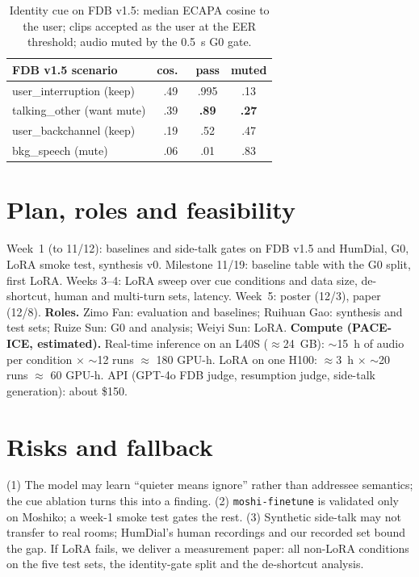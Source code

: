 \documentclass[11pt]{article}
\begin{document}
\begin{table}[t]
\centering\small
\begin{tabular}{lccc}
\toprule
FDB v1.5 scenario & cos.\ & pass & muted \\
\midrule
user\_interruption (keep) & .49 & .995 & .13 \\
talking\_other (want mute) & .39 & \textbf{.89} & \textbf{.27} \\
user\_backchannel (keep) & .19 & .52 & .47 \\
bkg\_speech (mute) & .06 & .01 & .83 \\
\bottomrule
\end{tabular}
\caption{Identity cue on FDB v1.5: median ECAPA cosine to the user; clips accepted as the user at the EER threshold; audio muted by the 0.5~s G0 gate.}
\label{tab:pilot}
\end{table}

\section{Plan, roles and feasibility}
Week~1 (to 11/12): baselines and side-talk gates on FDB v1.5 and HumDial, G0, LoRA smoke test, synthesis v0. Milestone 11/19: baseline table with the G0 split, first LoRA. Weeks 3--4: LoRA sweep over cue conditions and data size, de-shortcut, human and multi-turn sets, latency. Week~5: poster (12/3), paper (12/8).
\textbf{Roles.} Zimo Fan: evaluation and baselines; Ruihuan Gao: synthesis and test sets; Ruize Sun: G0 and analysis; Weiyi Sun: LoRA.
\textbf{Compute (PACE-ICE, estimated).} Real-time inference on an L40S ($\approx$24~GB): $\sim$15~h of audio per condition $\times$ $\sim$12 runs $\approx$ 180 GPU-h. LoRA on one H100: $\approx$3~h $\times$ $\sim$20 runs $\approx$ 60 GPU-h. API (GPT-4o FDB judge, resumption judge, side-talk generation): about \$150.

\section{Risks and fallback}
(1) The model may learn ``quieter means ignore'' rather than addressee semantics; the cue ablation turns this into a finding. (2) \texttt{moshi-finetune} is validated only on Moshiko; a week-1 smoke test gates the rest. (3) Synthetic side-talk may not transfer to real rooms; HumDial's human recordings and our recorded set bound the gap. If LoRA fails, we deliver a measurement paper: all non-LoRA conditions on the five test sets, the identity-gate split and the de-shortcut analysis.


\end{document}
